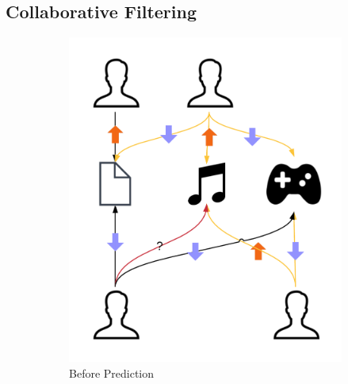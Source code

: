 \subsection{Collaborative Filtering}
\cite{goldberg_using_1992}
\begin{figure}[!h]
\centering
\begin{subfigure}[b]{0.4\textwidth}
    \centering
    \includegraphics[width=\textwidth]{c-back_images/cf_1.png}
    \caption{Before Prediction}
    \label{fig:cf1}
\end{subfigure}
\hfill
\begin{subfigure}[b]{0.4\textwidth}
    \centering

\end{subfigure}
\end{figure}
